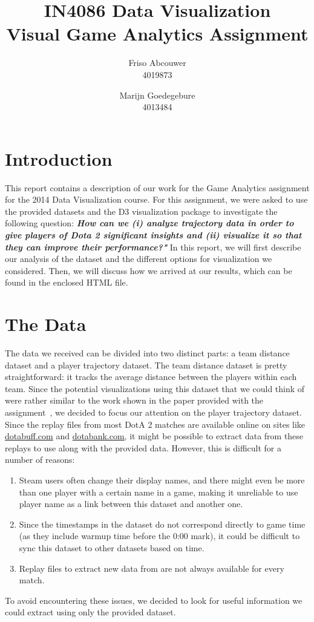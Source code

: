 \documentclass[a4paper,11pt]{article}
\title{IN4086 Data Visualization \\
Visual Game Analytics Assignment \\ }
\author{
Friso Abcouwer \\
4019873 \\
\and
Marijn Goedegebure \\
4013484
}
\begin{document}
\maketitle{}
\newpage

\section{Introduction}
This report contains a description of our work for the Game Analytics assignment for the 2014 Data Visualization course.
For this assignment, we were asked to use the provided datasets and the D3 visualization package to investigate the following question: \textbf{\textit{How can we (i) analyze trajectory data in order to give players of Dota 2 significant insights and (ii) visualize it so that they can improve their performance?"}}
In this report, we will first describe our analysis of the dataset and the different options for visualization we considered. Then, we will discuss how we arrived at our results, which can be found in the enclosed HTML file.

\section{The Data}
The data we received can be divided into two distinct parts: a team distance dataset and a player trajectory dataset.
The team distance dataset is pretty straightforward: it tracks the average distance between the players within each team.
Since the potential visualizations using this dataset that we could think of were rather similar to the work shown in the paper provided with the assignment~\cite{drachenskill}, we decided to focus our attention on the player trajectory dataset.\\

Since the replay files from most DotA 2 matches are available online on sites like \url{dotabuff.com} and \url{dotabank.com}, it might be possible to extract data from these replays to use along with the provided data. However, this is difficult for a number of reasons:
\begin{enumerate}
\item Steam users often change their display names, and there might even be more than one player with a certain name in a game, making it unreliable to use player name as a link between this dataset and another one.
\item Since the timestamps in the dataset do not correspond directly to game time (as they include warmup time before the 0:00 mark), it could be difficult to sync this dataset to other datasets based on time.
\item Replay files to extract new data from are not always available for every match.
\end{enumerate}
To avoid encountering these issues, we decided to look for useful information we could extract using only the provided dataset.
\end{document}
